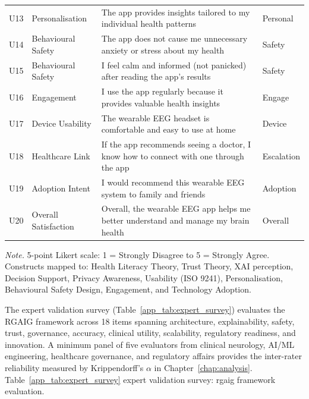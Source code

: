{\begin{xltabular}{\textwidth}{@{} >{\raggedright\arraybackslash}p{0.5cm} >{\raggedright\arraybackslash}p{2.5cm} L p{1.5cm} @{}}
\addlinespace
U13 & Personalisation & The app provides insights tailored to my individual health patterns & Personal \\
\addlinespace
U14 & Behavioural Safety & The app does not cause me unnecessary anxiety or stress about my health & Safety \\
\addlinespace
U15 & Behavioural Safety & I feel calm and informed (not panicked) after reading the app's results & Safety \\
\addlinespace
U16 & Engagement & I use the app regularly because it provides valuable health insights & Engage \\
\addlinespace
U17 & Device Usability & The wearable EEG headset is comfortable and easy to use at home & Device \\
\addlinespace
U18 & Healthcare Link & If the app recommends seeing a doctor, I know how to connect with one through the app & Escalation \\
\addlinespace
U19 & Adoption Intent & I would recommend this wearable EEG system to family and friends & Adoption \\
\addlinespace
U20 & Overall Satisfaction & Overall, the wearable EEG app helps me better understand and manage my brain health & Overall \\
\end{xltabular}}
\vspace{0.5em}\noindent\textit{Note.} 5-point Likert scale: 1 = Strongly Disagree to 5 = Strongly Agree. Constructs mapped to: Health Literacy Theory, Trust Theory, XAI perception, Decision Support, Privacy Awareness, Usability (ISO 9241), Personalisation, Behavioural Safety Design, Engagement, and Technology Adoption.

\noindent The expert validation survey (Table~\ref{app_tab:expert_survey}) evaluates the RGAIG framework across 18 items spanning architecture, explainability, safety, trust, governance, accuracy, clinical utility, scalability, regulatory readiness, and innovation. A minimum panel of five evaluators from clinical neurology, AI/ML engineering, healthcare governance, and regulatory affairs provides the inter-rater reliability measured by Krippendorff's $\alpha$ in Chapter~\ref{chap:analysis}.
\noindent Table~\ref{app_tab:expert_survey} expert validation survey: rgaig framework evaluation.

